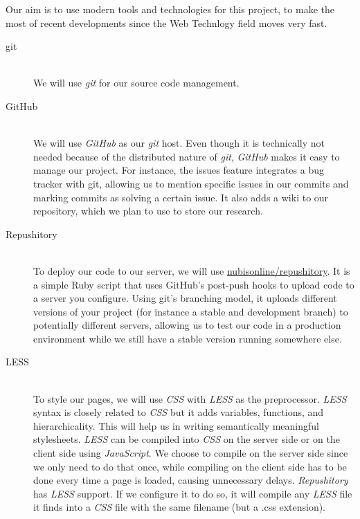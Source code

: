 Our aim is to use modern tools and technologies for this project, to make the most of recent developments since the Web Technlogy field moves very fast.

\begin{description}
	\item[git]\hfill\\
		We will use \textit{git} for our source code management.
		
	\item[GitHub]\hfill\\
		We will use \textit{GitHub} as our \textit{git} host. Even though it is technically not needed because of the distributed nature of \textit{git}, \textit{GitHub} makes it easy to manage our project.
		For instance, the issues feature integrates a bug tracker with git, allowing us to mention specific issues in our commits and marking commits as solving a certain issue.
		It also adds a wiki to our repository, which we plan to use to store our research.
	
	\item[Repushitory]\hfill\\
		To deploy our code to our server, we will use \href{https://github.com/nubisonline/repushitory}{nubisonline/repushitory}.
		It is a simple Ruby script that uses GitHub's post-push hooks to upload code to a server you configure.
		Using git's branching model, it uploads different versions of your project (for instance a stable and development branch) to potentially different servers, allowing us to test our code in a production environment while we still have a stable version running somewhere else.

	\item[LESS]\hfill\\
		To style our pages, we will use \textit{CSS} with \textit{LESS} as the preprocessor.
		\textit{LESS} syntax is closely related to \textit{CSS} but it adds variables, functions, and hierarchicality.
		This will help us in writing semantically meaningful stylesheets.
		\textit{LESS} can be compiled into \textit{CSS} on the server side or on the client side using \textit{JavaScript}.
		We choose to compile on the server side since we only need to do that once, while compiling on the client side has to be done every time a page is loaded, causing unnecessary delays.
		\textit{Repushitory} has \textit{LESS} support.
		If we configure it to do so, it will compile any \textit{LESS} file it finds into a \textit{CSS} file with the same filename (but a .css extension).


\end{description}
